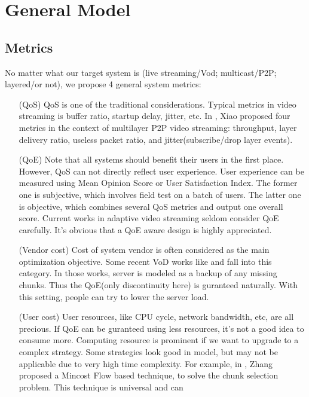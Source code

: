 \documentclass[11pt,a4paper]{article}
\begin{document}
\section{General Model}
\label{sec:gen_model}

\subsection{Metrics}

No matter what our target system is
(live streaming/Vod; multicast/P2P; layered/or not), we propose 4 general 
system metrics: 
\begin{itemize}
	\item [(QoS)] QoS is one of the traditional considerations. 
	Typical metrics in video streaming is buffer ratio, startup delay, 
	jitter, etc. In \cite{xiao2009layerp2p}, Xiao proposed four metrics 
	in the context of multilayer P2P video streaming: throughput, 
	layer delivery ratio, useless packet ratio, and jitter(subscribe/drop layer 
	events). 
	\item [(QoE)] Note that all systems should benefit their users
	in the first place. However, QoS can not directly reflect user experience. 
	User experience can be measured using Mean Opinion Score\cite{wang2011-perceptual}
	or User Satisfaction Index. The former one is subjective, which involves
	field test on a batch of users. The latter one is objective, which combines 
	several QoS metrics and output one overall score. 
	Current works in adaptive video streaming seldom consider QoE carefully. 
	It's obvious that a QoE aware design is highly appreciated. 
	\item [(Vendor cost)] Cost of system vendor is often considered as 
	the main optimization objective. Some recent VoD works like 
	\cite{wu2011vod-rep} and \cite{zhou2011statistical} fall into this 
	category. In those works, server is modeled as a backup of any missing
	chunks. Thus the QoE(only discontinuity here) is guranteed naturally. 
	With this setting, people can try to lower the server load. 
	\item [(User cost)] User resources, like CPU cycle, network bandwidth, etc, 
	are all precious. If QoE can be guranteed using less resources, it's 
	not a good idea to consume more. Computing resource is prominent if we 
	want to upgrade to a complex strategy. Some strategies look good in model, 
	but may not be applicable due to very high time complexity. For example, 
	in \cite{zhang2006optimal}, Zhang proposed a Mincost Flow based technique, 
	to solve the chunk selection problem. This technique is universal and can 

\end{itemize}
\end{document}
